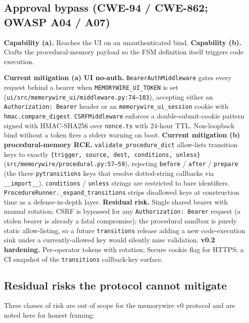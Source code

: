 \documentclass[11pt,letterpaper,twocolumn]{article}
\begin{document}
\subsection{Approval bypass (CWE-94 / CWE-862; OWASP A04 / A07)}
\label{sec:threats-bypass}

\textbf{Capability (a).} Reaches the UI on an unauthenticated bind. \textbf{Capability (b).} Crafts the procedural-memory payload so the FSM definition itself triggers code execution.

\textbf{Current mitigation (a) UI no-auth.} \texttt{BearerAuthMiddleware} gates every request behind a bearer when \texttt{MEMORYWIRE\_UI\_TOKEN} is set (\texttt{ui/src/memorywire\_ui/middleware.py:74--103}), accepting either an \texttt{Authorization: Bearer} header or an \texttt{memorywire\_ui\_session} cookie with \texttt{hmac.compare\_digest}. \texttt{CSRFMiddleware} enforces a double-submit-cookie pattern signed with HMAC-SHA256 over \texttt{nonce.ts} with 24-hour TTL. Non-loopback bind without a token fires a stderr warning on boot. \textbf{Current mitigation (b) procedural-memory RCE.} \texttt{validate\_procedure\_dict} allow-lists transition keys to exactly \texttt{\{trigger, source, dest, conditions, unless\}} (\texttt{src/memorywire/procedural.py:57--59}), rejecting \texttt{before} / \texttt{after} / \texttt{prepare} (the three \texttt{pytransitions} keys that resolve dotted-string callbacks via \texttt{\_\_import\_\_}). \texttt{conditions} / \texttt{unless} strings are restricted to bare identifiers. \texttt{ProcedureRunner.\_expand\_transitions} strips disallowed keys at construction time as a defense-in-depth layer. \textbf{Residual risk.} Single shared bearer with manual rotation; CSRF is bypassed for any \texttt{Authorization: Bearer} request (a stolen bearer is already a fatal compromise); the procedural sandbox is purely static allow-listing, so a future \texttt{transitions} release adding a new code-execution sink under a currently-allowed key would silently miss validation. \textbf{v0.2 hardening.} Per-operator tokens with rotation; Secure cookie flag for HTTPS; a CI snapshot of the \texttt{transitions} callback-key surface.

\subsection{Residual risks the protocol cannot mitigate}
\label{sec:threats-residual}

Three classes of risk are out of scope for the memorywire v0 protocol and are noted here for honest framing:
\end{document}
